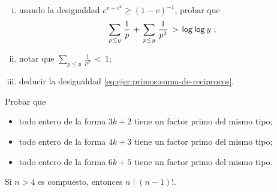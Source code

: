 \begin{ejerPrimos}
\begin{enumerate}[(i)]
		\item\label{item:ejer:primos:suma-de-reciprocos:v}
			usando la desigualdad $e^{v+v^2}\geq (1-v)^{-1}$,
			probar que
			\begin{displaymath}
				\sum_{p\leq y}\,\frac 1{p}\,+\,
					\sum_{p\leq y}\,\frac 1{p^2}\,>\,
					\mathsf{log}_{}\,\mathsf{log}_{}\,y
				\text{ ;}
			\end{displaymath}
		\item\label{item:ejer:primos:suma-de-reciprocos:vi}
			notar que $\sum_{p\leq y}\,\frac 1{p^2}\,<\,1$;%
		\item\label{item:ejer:primos:suma-de-reciprocos:vii}
			deducir la desigualdad
			\eqref{eq:ejer:primos:suma-de-reciprocos}.
	\end{enumerate}
\end{ejerPrimos}

\begin{ejerPrimos}
	Probar que
	\begin{itemize}
		\item todo entero de la forma $3k+2$ tiene un factor primo
			del mismo tipo;
		\item todo entero de la forma $4k+3$ tiene un factor primo
			del mismo tipo;
		\item todo entero de la forma $6k+5$ tiene un factor primo
			del mismo tipo.
	\end{itemize}
\end{ejerPrimos}


\begin{ejerPrimos}
	Si $n>4$ es compuesto, entonces $n\mid (n-1)!$.
\end{ejerPrimos}



